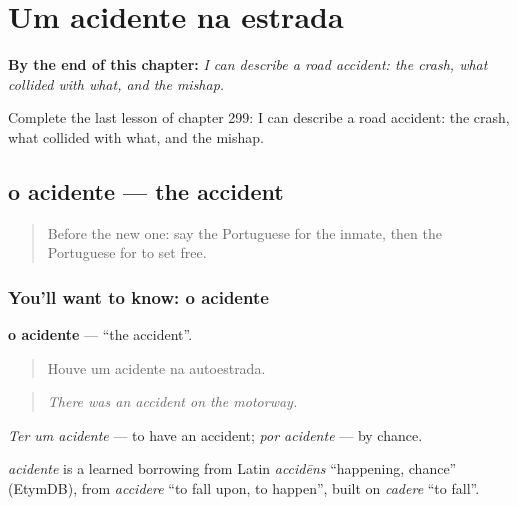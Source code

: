 
\chapter{Um acidente na estrada}
\label{ch:pt-um-acidente-na-estrada}

\begin{chapteropening}
\textbf{By the end of this chapter:} \emph{I can describe a road accident: the crash, what collided with what, and the mishap.}

Complete the last lesson of chapter 299: I can describe a road accident: the crash, what collided with what, and the mishap.
\end{chapteropening}

\section[o acidente]{o acidente — the accident}

\label{lesson:PT-C299-acidente}



\begin{quote}
Before the new one: say the Portuguese for the inmate, then the Portuguese for to set free.
\end{quote}

\subsection*{You'll want to know: o acidente}
\textbf{o acidente} — \textquotedblleft{}the accident\textquotedblright{}.

\begin{quote}
Houve um acidente na autoestrada.
\end{quote}

\begin{quote}
\emph{There was an accident on the motorway.}
\end{quote}

\emph{Ter um acidente} — to have an accident; \emph{por acidente} — by chance.

\begin{cousinweb}
\emph{acidente} is a learned borrowing from Latin \emph{accidēns} \textquotedblleft{}happening, chance\textquotedblright{} (EtymDB), from \emph{accidere} \textquotedblleft{}to fall upon, to happen\textquotedblright{}, built on \emph{cadere} \textquotedblleft{}to fall\textquotedblright{}.
\end{cousinweb}


